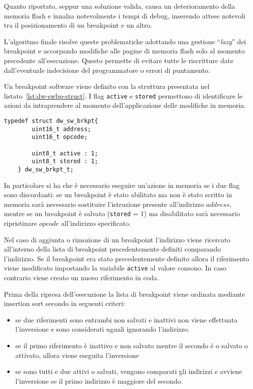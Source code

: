 Quanto riportato, seppur una soluzione valida, causa un deterioramento della memoria flash e innalza notevolmente i tempi di debug, inserendo attese notevoli tra il posizionamento di un breakpoint e un altro.

L'algoritmo finale risolve queste problematiche adottando una gestione ``\textit{lazy}'' dei breakpoint e accorpando modifiche alle pagine di memoria flash solo al momento precedente all'esecuzione.
Questo permette di evitare tutte le riscritture date dall'eventuale indecisione del programmatore o errori di puntamento.

Un breakpoint software viene definito con la struttura presentata nel listato~\ref{lst:dw-swbp-struct}. I flag \texttt{active} e \texttt{stored} permettono di identificare le azioni da intraprendere al momento dell'applicazione delle modifiche in memoria.

\noindent\begin{minipage}{\textwidth}
    \begin{lstlisting}[style=C, caption={Struttura utilizzata per il salvataggio dei riferimenti ai breakpoint software}, label=lst:dw-swbp-struct]
    typedef struct dw_sw_brkpt{
        uint16_t address;
        uint16_t opcode;

        uint8_t active : 1;
        uint8_t stored : 1;
    } dw_sw_brkpt_t;
    \end{lstlisting}
\end{minipage}

In particolare si ha che è necessario eseguire un'azione in memoria se i due flag sono discordanti: se un breakpoint è stato abilitato ma non è stato scritto in memoria sarà necessario sostituire l'istruzione presente all'indirizzo \(address\), mentre se un breakpoint è salvato (\texttt{stored} = 1) ma disabilitato sarà necessario ripristinare \(opcode\) all'indirizzo specificato.

Nel caso di aggiunta o rimozione di un breakpoint l'indirizzo viene ricercato all'interno della lista di breakpoint precedentemente definiti comparando l'indirizzo. Se il breakpoint era stato precedentemente definito allora il riferimento viene modificato impostando la variabile \texttt{active} al valore consono. In caso contrario viene creato un nuovo riferimento in coda.

Prima della ripresa dell'esecuzione la lista di breakpoint viene ordinata mediante insertion sort secondo in seguenti criteri:
\begin{itemize}
    \item se due riferimenti sono entrambi non salvati e inattivi non viene effettuata l'inversione e sono considerati uguali ignorando l'indirizzo.
    \item se il primo riferimento è inattivo e non salvato mentre il secondo è o salvato o attivato, allora viene eseguita l'inversione
    \item se sono tutti e due attivi o salvati, vengono comparati gli indirizzi e avviene l'inversione se il primo indirizzo è maggiore del secondo.
\end{itemize}

